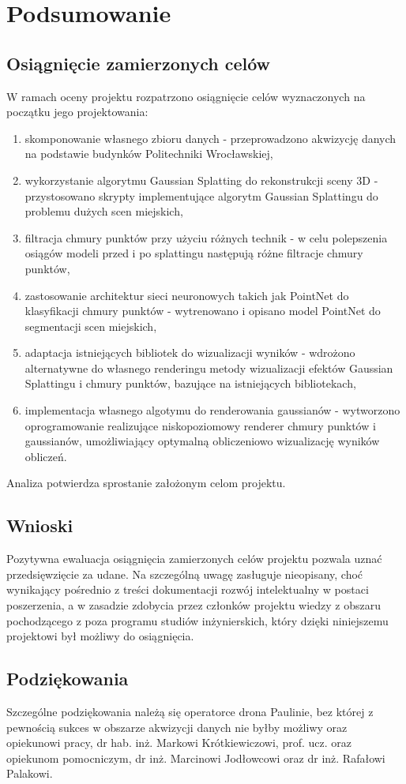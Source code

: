 \section{Podsumowanie}
\subsection{Osiągnięcie zamierzonych celów}

W ramach oceny projektu rozpatrzono osiągnięcie celów wyznaczonych na początku jego projektowania:

\begin{enumerate}
    \item skomponowanie własnego zbioru danych - przeprowadzono akwizycję danych na podstawie budynków Politechniki Wrocławskiej,
    \item wykorzystanie algorytmu Gaussian Splatting do rekonstrukcji sceny 3D - przystosowano skrypty implementujące algorytm Gaussian Splattingu do problemu dużych scen miejskich,
    \item filtracja chmury punktów przy użyciu różnych technik - w celu polepszenia osiągów modeli przed i po splattingu następują różne filtracje chmury punktów,
    \item zastosowanie architektur sieci neuronowych takich jak PointNet do klasyfikacji chmury punktów - wytrenowano i opisano model PointNet do segmentacji scen miejskich,
    \item adaptacja istniejących bibliotek do wizualizacji wyników - wdrożono alternatywne do własnego renderingu metody wizualizacji efektów Gaussian Splattingu i chmury punktów, bazujące na istniejących bibliotekach, 
    \item implementacja własnego algotymu do renderowania gaussianów - wytworzono oprogramowanie realizujące niskopoziomowy renderer chmury punktów i gaussianów, umożliwiający optymalną obliczeniowo wizualizację wyników obliczeń.
\end{enumerate}

Analiza potwierdza sprostanie założonym celom projektu.

\subsection{Wnioski}

Pozytywna ewaluacja osiągnięcia zamierzonych celów projektu pozwala uznać przedsięwzięcie za udane. Na szczególną uwagę zasługuje nieopisany, choć wynikający pośrednio z treści dokumentacji rozwój intelektualny w postaci poszerzenia, a w zasadzie zdobycia przez członków projektu wiedzy z obszaru pochodzącego z poza programu studiów inżynierskich, który dzięki niniejszemu projektowi był możliwy do osiągnięcia.

\subsection{Podziękowania}

Szczególne podziękowania należą się operatorce drona Paulinie, bez której z pewnością sukces w obszarze akwizycji danych nie byłby możliwy oraz opiekunowi pracy, dr hab. inż. Markowi Krótkiewiczowi, prof. ucz. oraz opiekunom pomocniczym, dr inż. Marcinowi Jodłowcowi oraz dr inż. Rafałowi Palakowi.
